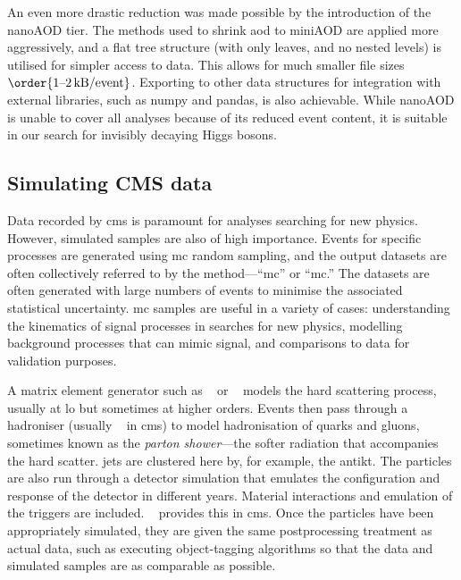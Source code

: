 An even more drastic reduction was made possible by the introduction of the nanoAOD tier. The methods used to shrink \acrshort{aod} to miniAOD are applied more aggressively, and a flat tree structure (with only leaves, and no nested levels) is utilised for simpler access to data. This allows for much smaller file sizes $\order{\text{1--2\,kB}/\text{event}}$. Exporting to other data structures for integration with external libraries, such as \textsf{numpy} and \textsf{pandas}, is also achievable. While nanoAOD is unable to cover all analyses because of its reduced event content, it is suitable in our search for invisibly decaying Higgs bosons.




\subsection{Simulating CMS data}
\label{subsec:cms_mc}

Data recorded by \acrshort{cms} is paramount for analyses searching for new physics. However, simulated samples are also of high importance. Events for specific processes are generated using \acrfull{mc} random sampling, and the output datasets are often collectively referred to by the method---``\acrlong{mc}'' or ``\acrshort{mc}.'' The datasets are often generated with large numbers of events to minimise the associated statistical uncertainty. \acrshort{mc} samples are useful in a variety of cases: understanding the kinematics of signal processes in searches for new physics, modelling background processes that can mimic signal, and comparisons to data for validation purposes.

A matrix element generator such as \madgraph~\cite{Alwall:2014hca} or \POWHEG~\cite{Nason:2004rx,Frixione:2007vw} models the hard scattering process, usually at \acrfull{lo} but sometimes at higher orders. Events then pass through a hadroniser (usually \PYTHIA~\cite{pythia82} in \acrshort{cms}) to model hadronisation of quarks and gluons, sometimes known as the \emph{parton shower}---the softer radiation that accompanies the hard scatter. \Glspl{jet} are clustered here by, for example, the \gls{antikt}. The particles are also run through a detector simulation that emulates the configuration and response of the detector in different years. Material interactions and emulation of the triggers are included. \GEANTfour~\cite{AGOSTINELLI2003250} provides this in \acrshort{cms}. Once the particles have been appropriately simulated, they are given the same postprocessing treatment as actual data, such as executing object-tagging algorithms so that the data and simulated samples are as comparable as possible.


